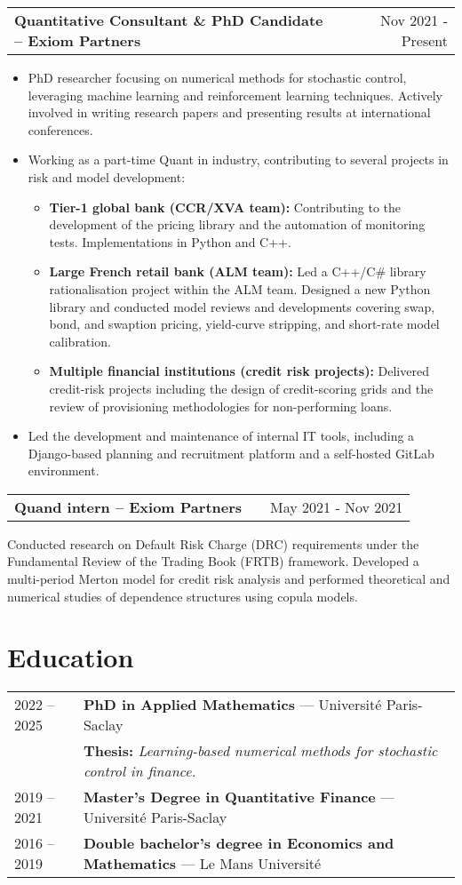 \documentclass[a4paper,12pt]{article}
\makeatletter
\newenvironment{jobshort}[2]
    {
    \begin{tabularx}{\linewidth}{@{}l X r@{}}
    \textbf{#1} & \hfill &  #2 \\[3.75pt]
    \end{tabularx}
    }
    {
    }
\newenvironment{joblong}[2]
    {
    \begin{tabularx}{\linewidth}{@{}l X r@{}}
    \textbf{#1} & \hfill &  #2 \\[3.75pt]
    \end{tabularx}
    \begin{minipage}[t]{\linewidth}
    \begin{itemize}[nosep,after=\strut, leftmargin=1em, itemsep=3pt,label=--]
    }
    {
    \end{itemize}
    \end{minipage}    
    }
\makeatother
\begin{document}
	\begin{joblong}{Quantitative Consultant \& PhD Candidate -- Exiom Partners}{Nov 2021 - Present}
	\item PhD researcher focusing on numerical methods for stochastic control, leveraging machine learning and reinforcement learning techniques. Actively involved in writing research papers and presenting results at international conferences.
	\item Working as a part-time Quant in industry, contributing to several projects in risk and model development:
		\begin{itemize}
			\item \textbf{Tier-1 global bank (CCR/XVA team):} Contributing to the development of the pricing library and the automation of monitoring tests. Implementations in Python and C++.
			\item \textbf{Large French retail bank (ALM team):} Led a C++/C\# library rationalisation project within the ALM team. Designed a new Python library and conducted model reviews and developments covering swap, bond, and swaption pricing, yield-curve stripping, and short-rate model calibration.
			\item \textbf{Multiple financial institutions (credit risk projects):} Delivered credit-risk projects including the design of credit-scoring grids and the review of provisioning methodologies for non-performing loans.
		\end{itemize}
	\item Led the development and maintenance of internal IT tools, including a Django-based planning and recruitment platform and a self-hosted GitLab environment.
	\end{joblong}

	\begin{jobshort}{Quand intern -- Exiom Partners}{May 2021 - Nov 2021}
	Conducted research on Default Risk Charge (DRC) requirements under the Fundamental Review of the Trading Book (FRTB) framework.
	Developed a multi-period Merton model for credit risk analysis and performed theoretical and numerical studies of dependence structures using copula models.
	\end{jobshort}

	\section{Education}
	\begin{tabularx}{\linewidth}{@{}l X@{}}	
		2022 -- 2025 & \textbf{PhD in Applied Mathematics} — Université Paris-Saclay \\
		& \textbf{Thesis:} \textit{Learning-based numerical methods for stochastic control in finance.} \\
		2019 -- 2021 & \textbf{Master’s Degree in Quantitative Finance} — Université Paris-Saclay \\
		2016 -- 2019 & \textbf{Double bachelor’s degree in Economics and Mathematics} — Le Mans Université
	\end{tabularx}
\end{document}
